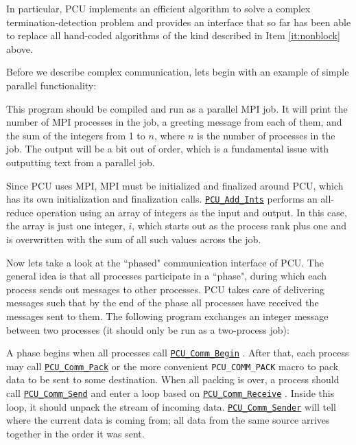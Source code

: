 \documentclass{article}
\begin{document}
In particular, PCU implements an efficient algorithm to solve a complex
termination-detection problem and provides an interface that
so far has been able to replace all hand-coded algorithms
of the kind described in Item \ref{it:nonblock} above.

Before we describe complex communication, lets begin with an example
of simple parallel functionality:



This program should be compiled and run as a parallel MPI job.
It will print the number of MPI processes in the job, a greeting
message from each of them, and the sum of the integers from 1 to $n$,
where $n$ is the number of processes in the job.
The output will be a bit out of order, which is a fundamental issue
with outputting text from a parallel job.

Since PCU uses MPI, MPI must be initialized and finalized around
PCU, which has its own initialization and finalization calls.
\href{http://scorec.rpi.edu/~dibanez/core/pcu_8c.html#abf86ddf22cc114fd2bd3f054a067c225}{\texttt{PCU\_Add\_Ints}}
performs an all-reduce operation using
an array of integers as the input and output.
In this case, the array is just one integer, $i$, which starts
out as the process rank plus one and is overwritten with the sum
of all such values across the job.

Now lets take a look at the ``phased" communication interface of PCU.
The general idea is that all processes participate in a ``phase",
during which each process sends out messages to other processes.
PCU takes care of delivering messages such that by the end of
the phase all processes have received the messages sent to them.
The following program exchanges an integer message between two
processes (it should only be run as a two-process job):



A phase begins when all processes call
\href{http://scorec.rpi.edu/~dibanez/core/pcu_8c.html#aa1821bf79d880c38cdd91515751799ac}{\texttt{PCU\_Comm\_Begin}}
.
After that, each process may call
\href{http://scorec.rpi.edu/~dibanez/core/pcu_8c.html#afd8a6600d960129089c45fd49c1b2311}{\texttt{PCU\_Comm\_Pack}}
or the more convenient
\texttt{PCU\_COMM\_PACK}
macro to pack data to be sent to some destination.
When all packing is over, a process should call
\href{http://scorec.rpi.edu/~dibanez/core/pcu_8c.html#a263061f00174fc7a004dcb198778006c}{\texttt{PCU\_Comm\_Send}}
and enter a loop based on
\href{http://scorec.rpi.edu/~dibanez/core/pcu_8c.html#ad02bc960bcfa8e2d6b09458dca38bf53}{\texttt{PCU\_Comm\_Receive}}
.
Inside this loop, it should unpack the stream of incoming data.
\href{http://scorec.rpi.edu/~dibanez/core/pcu_8c.html#ac4577ded2ec61de4b4141e3353aac440}{\texttt{PCU\_Comm\_Sender}}
will tell where the current data is coming
from; all data from the same source arrives together in the
order it was sent.
\end{document}
